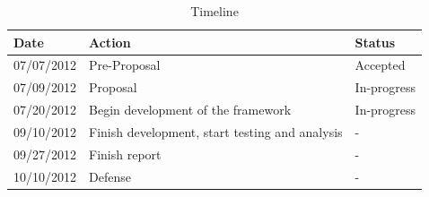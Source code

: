 \begin{table}[h]
\centering
\begin{tabular}{|l|l|l|}
\hline
Date & Action & Status\\
\hline
07/07/2012 & Pre-Proposal & Accepted\\
07/09/2012 & Proposal & In-progress\\
07/20/2012 & Begin development of the framework & In-progress\\
09/10/2012 & Finish development, start testing and analysis & - \\
09/27/2012 & Finish report & - \\
10/10/2012 & Defense & - \\
\hline
\end{tabular}
\caption{Timeline}
\label{tab:template}
\end{table}



\singlespacing




